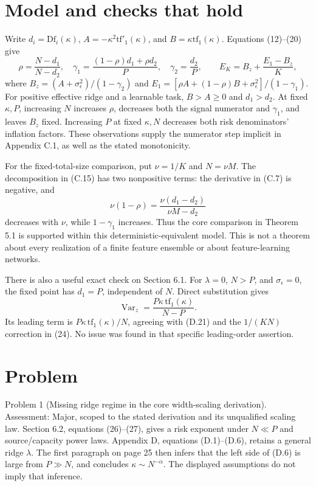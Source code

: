 \documentclass[10pt]{article}
\begin{document}
\section*{Model and checks that hold}
Write \(d_i=\mathrm{Df}_i(\kappa)\), \(A=-\kappa^2\mathrm{tf}'_1(\kappa)\), and \(B=\kappa\mathrm{tf}_1(\kappa)\). Equations (12)–(20) give \[\rho=\frac{N-d_1}{N-d_2},\quad
 \gamma_1=\frac{(1-\rho)d_1+\rho d_2}{P},\quad
 \gamma_2=\frac{d_2}{P},\qquad
 E_K=B_z+\frac{E_1-B_z}{K},\] where \(B_z=(A+\sigma_\epsilon^2)/(1-\gamma_2)\) and \(E_1=[\rho A+(1-\rho)B+\sigma_\epsilon^2]/(1-\gamma_1)\). For positive effective ridge and a learnable task, \(B>A\geq0\) and \(d_1>d_2\). At fixed \(\kappa,P\), increasing \(N\) increases \(\rho\), decreases both the signal numerator and \(\gamma_1\), and leaves \(B_z\) fixed. Increasing \(P\) at fixed \(\kappa,N\) decreases both risk denominators’ inflation factors. These observations supply the numerator step implicit in Appendix C.1, as well as the stated monotonicity.\par
For the fixed-total-size comparison, put \(\nu=1/K\) and \(N=\nu M\). The decomposition in (C.15) has two nonpositive terms: the derivative in (C.7) is negative, and \[\nu(1-\rho)=\frac{\nu(d_1-d_2)}{\nu M-d_2}\] decreases with \(\nu\), while \(1-\gamma_1\) increases. Thus the core comparison in Theorem 5.1 is supported within this deterministic-equivalent model. This is not a theorem about every realization of a finite feature ensemble or about feature-learning networks.\par
There is also a useful exact check on Section 6.1. For \(\lambda=0\), \(N>P\), and \(\sigma_\epsilon=0\), the fixed point has \(d_1=P\), independent of \(N\). Direct substitution gives \[\operatorname{Var}_z=\frac{P\kappa\,\mathrm{tf}_1(\kappa)}{N-P}.\] Its leading term is \(P\kappa\,\mathrm{tf}_1(\kappa)/N\), agreeing with (D.21) and the \(1/(KN)\) correction in (24). No issue was found in that specific leading-order assertion.\par
\section*{Problem}
Problem 1 (Missing ridge regime in the core width-scaling derivation).  Assessment: Major, scoped to the stated derivation and its unqualified scaling law. Section 6.2, equations (26)–(27), gives a risk exponent under \(N\ll P\) and source/capacity power laws. Appendix D, equations (D.1)–(D.6), retains a general ridge \(\lambda\). The first paragraph on page 25 then infers that the left side of (D.6) is large from \(P\gg N\), and concludes \(\kappa\sim N^{-\alpha}\). The displayed assumptions do not imply that inference.\par
\end{document}
